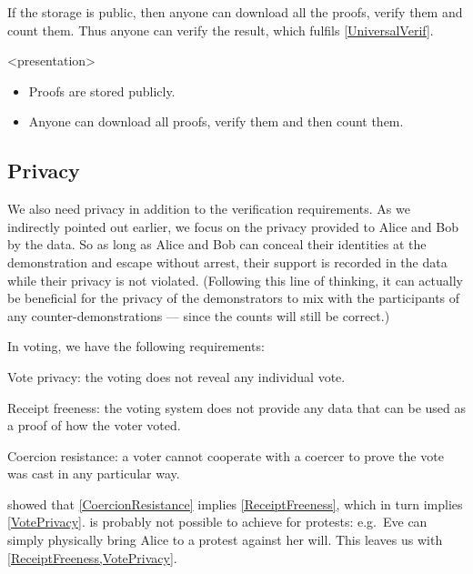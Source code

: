 If the storage is public, then anyone can download all the proofs, verify them 
and count them.
Thus anyone can verify the result, which fulfils \cref{UniversalVerif}.

\begin{frame}<presentation>
  \begin{idea}
    \begin{itemize}
      \item Proofs are stored publicly.
      \item Anyone can download all proofs, verify them and then count them.
    \end{itemize}
  \end{idea}
\end{frame}

\subsection{Privacy}
\label{Privacy}

We also need privacy in addition to the verification requirements.
As we indirectly pointed out earlier, we focus on the privacy provided to Alice 
and Bob by the data.
So as long as Alice and Bob can conceal their identities at the demonstration 
and escape without arrest, their support is recorded in the data while their 
privacy is not violated.
(Following this line of thinking, it can actually be beneficial for the privacy 
of the demonstrators to mix with the participants of any counter-demonstrations 
--- since the counts will still be correct.)

In voting, we have the following requirements:
\begin{frame}
\begin{requirements}[P]
\item\label{VotePrivacy} Vote privacy: the voting does not reveal any 
  individual vote.
\item\label{ReceiptFreeness} Receipt freeness: the voting system does not 
  provide any data that can be used as a proof of how the voter voted.
\item\label{CoercionResistance} Coercion resistance: a voter cannot cooperate 
  with a coercer to prove the vote was cast in any particular way.
\end{requirements}
\pause
{}
\end{frame}
\Textcite{VerifyingPrivacyPropertiesOfVotingProtocols} showed that 
\cref{CoercionResistance} implies \cref{ReceiptFreeness}, which in turn implies
\cref{VotePrivacy}.
 is probably not possible to achieve for protests:
e.g.\ Eve can simply physically bring Alice to a protest against her will.
This leaves us with \cref{ReceiptFreeness,VotePrivacy}.

